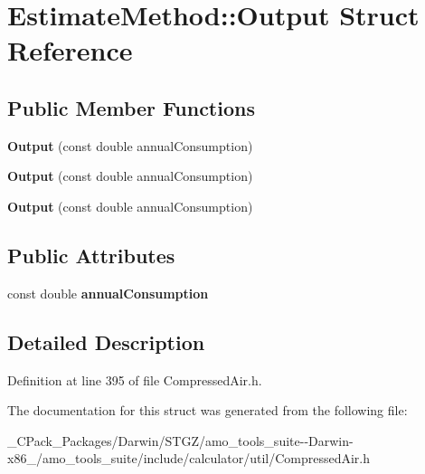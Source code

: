 \hypertarget{struct_estimate_method_1_1_output}{}\section{Estimate\+Method\+:\+:Output Struct Reference}
\label{struct_estimate_method_1_1_output}
\subsection*{Public Member Functions}
\begin{DoxyCompactItemize}
\item 
\mbox{\label{struct_estimate_method_1_1_output_abef83c82de30686d6932ec81767ed016}} 
{\bfseries Output} (const double annual\+Consumption)
\item 
\mbox{\label{struct_estimate_method_1_1_output_abef83c82de30686d6932ec81767ed016}} 
{\bfseries Output} (const double annual\+Consumption)
\item 
\mbox{\label{struct_estimate_method_1_1_output_abef83c82de30686d6932ec81767ed016}} 
{\bfseries Output} (const double annual\+Consumption)
\end{DoxyCompactItemize}
\subsection*{Public Attributes}
\begin{DoxyCompactItemize}
\item 
\mbox{\label{struct_estimate_method_1_1_output_a54beb7e757d49cde8fc0359959b8a11a}} 
const double {\bfseries annual\+Consumption}
\end{DoxyCompactItemize}


\subsection{Detailed Description}


Definition at line 395 of file Compressed\+Air.\+h.



The documentation for this struct was generated from the following file\+:\begin{DoxyCompactItemize}
\item 
\+\_\+\+C\+Pack\+\_\+\+Packages/\+Darwin/\+S\+T\+G\+Z/amo\+\_\+tools\+\_\+suite-\/-\/\+Darwin-\/x86\+\_/amo\+\_\+tools\+\_\+suite/include/calculator/util/Compressed\+Air.\+h\end{DoxyCompactItemize}
